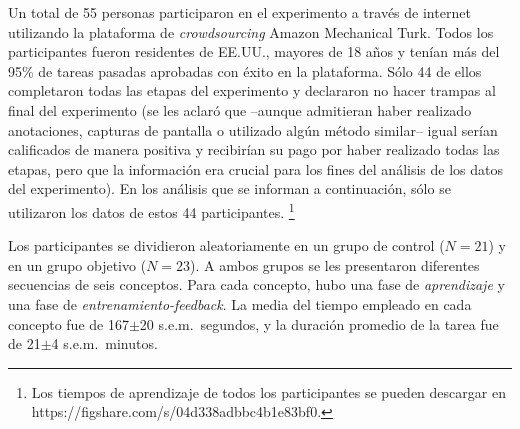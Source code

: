 
Un total de 55 personas participaron en el experimento a través de internet utilizando la plataforma de \textit{crowdsourcing} Amazon Mechanical Turk. Todos los participantes fueron residentes de EE.UU., mayores de 18 años y tenían más del 95\% de tareas pasadas aprobadas con éxito en la plataforma. Sólo 44 de ellos completaron todas las etapas del experimento y declararon no hacer trampas al final del experimento (se les aclaró que --aunque admitieran haber realizado anotaciones, capturas de pantalla o utilizado algún método similar-- igual serían calificados de manera positiva y recibirían su pago por haber realizado todas las etapas, pero que la información era crucial para los fines del análisis de los datos del experimento). En los análisis que se informan a continuación, sólo se utilizaron los datos de estos 44 participantes. \footnote{Los tiempos de aprendizaje de todos los participantes se pueden descargar en https://figshare.com/s/04d338adbbc4b1e83bf0.}


Los participantes se dividieron aleatoriamente en un grupo de control ($N=21$) y en un grupo objetivo ($N=23$). A ambos grupos se les presentaron diferentes secuencias de seis conceptos. Para cada concepto, hubo una fase de {\em aprendizaje} y una fase de {\em entrenamiento-feedback}. La media del tiempo empleado en cada concepto fue de 167$\pm$20 s.e.m.\ segundos, y la duración promedio de la tarea fue de 21$\pm$4 s.e.m.\ minutos. 

